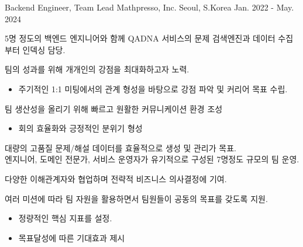 \begin{cventries}
  \cventry
    {Backend Engineer, Team Lead} %
    {Mathpresso, Inc.} %
    {Seoul, S.Korea} %
    {Jan. 2022 - May. 2024} %
    {
      \begin{cvsubentries}
        \begin{cvitems}
          \item[] {5명 정도의 백엔드 엔지니어와 함께 QADNA 서비스의 문제 검색엔진과 데이터 수집부터 인덱싱 담당.}
          \item {팀의 성과를 위해 개개인의 강점을 최대화하고자 노력.}
          \begin{itemize}
            \item {주기적인 1:1 미팅에서의 관계 형성을 바탕으로 강점 파악 및 커리어 목표 수립.}
          \end{itemize}
          \item {팀 생산성을 올리기 위해 빠르고 원활한 커뮤니케이션 환경 조성}
          \begin{itemize}
            \item {회의 효율화와 긍정적인 분위기 형성}
          \end{itemize}
          \item[]
        \end{cvitems}
        \begin{cvitems}
          \item[] {대량의 고품질 문제/해설 데이터를 효율적으로 생성 및 관리가 목표. \\ 엔지니어, 도메인 전문가, 서비스 운영자가 유기적으로 구성된 7명정도 규모의 팀 운영.}
          \item {다양한 이해관계자와 협업하며 전략적 비즈니스 의사결정에 기여.}
          \item {여러 미션에 따라 팀 자원을 활용하면서 팀원들이 공동의 목표를 갖도록 지원.}
          \begin{itemize}
            \item {정량적인 핵심 지표를 설정.}
            \item {목표달성에 따른 기대효과 제시}
          \end{itemize}
          \item[] 
        \end{cvitems}
      \end{cvsubentries}
    }


\end{cventries}
